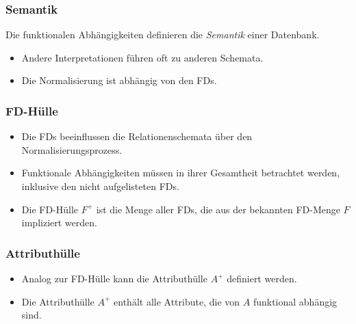             \subsubsection{Semantik} %
            	Die funktionalen Abhängigkeiten definieren die \textit{Semantik} einer Datenbank.
                \begin{itemize}
           			\item Andere Interpretationen führen oft zu anderen Schemata.
           			\item Die Normalisierung ist abhängig von den FDs.
                \end{itemize}

            \subsubsection{FD-Hülle} %
                \begin{itemize}
                	\item Die FDs beeinflussen die Relationenschemata über den Normalisierungsprozess.
                	\item Funktionale Abhängigkeiten müssen in ihrer Gesamtheit betrachtet werden, inklusive den nicht aufgelisteten FDs.
                	\item Die FD-Hülle \(F^+\) ist die Menge aller FDs, die aus der bekannten FD-Menge \(F\) impliziert werden.
                \end{itemize}

            \subsubsection{Attributhülle} %
                \begin{itemize}
                	\item Analog zur FD-Hülle kann die Attributhülle \(A^+\) definiert werden.
                	\item Die Attributhülle \(A^+\) enthält alle Attribute, die von \(A\) funktional abhängig sind.
                \end{itemize}

